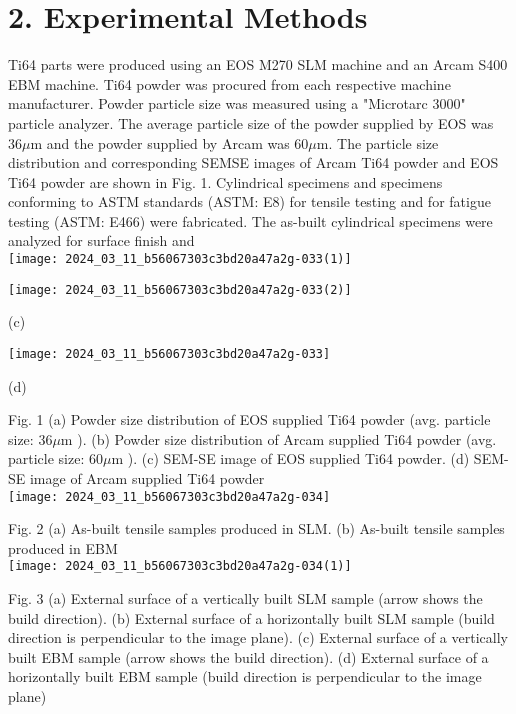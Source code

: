 \documentclass[10pt]{article}
\begin{document}
\section*{2. Experimental Methods}
Ti64 parts were produced using an EOS M270 SLM machine and an Arcam S400 EBM machine. Ti64 powder was procured from each respective machine manufacturer. Powder particle size was measured using a "Microtarc 3000" particle analyzer. The average particle size of the powder supplied by EOS was $36 \mu \mathrm{m}$ and the powder supplied by Arcam was $60 \mu \mathrm{m}$. The particle size distribution and corresponding SEMSE images of Arcam Ti64 powder and EOS Ti64 powder are shown in Fig. 1. Cylindrical specimens and specimens conforming to ASTM standards (ASTM: E8) for tensile testing and for fatigue testing (ASTM: E466) were fabricated. The as-built cylindrical specimens were analyzed for surface finish and\\
\texttt{[image: 2024\_03\_11\_b56067303c3bd20a47a2g-033(1)]}

\begin{center}
\texttt{[image: 2024\_03\_11\_b56067303c3bd20a47a2g-033(2)]}
\end{center}

(c)

\begin{center}
\texttt{[image: 2024\_03\_11\_b56067303c3bd20a47a2g-033]}
\end{center}

(d)

Fig. 1 (a) Powder size distribution of EOS supplied Ti64 powder (avg. particle size: $36 \mu \mathrm{m}$ ). (b) Powder size distribution of Arcam supplied Ti64 powder (avg. particle size: $60 \mu \mathrm{m}$ ). (c) SEM-SE image of EOS supplied Ti64 powder. (d) SEM-SE image of Arcam supplied Ti64 powder\\
\texttt{[image: 2024\_03\_11\_b56067303c3bd20a47a2g-034]}

Fig. 2 (a) As-built tensile samples produced in SLM. (b) As-built tensile samples produced in EBM\\
\texttt{[image: 2024\_03\_11\_b56067303c3bd20a47a2g-034(1)]}

Fig. 3 (a) External surface of a vertically built SLM sample (arrow shows the build direction). (b) External surface of a horizontally built SLM sample (build direction is perpendicular to the image plane). (c) External surface of a vertically built EBM sample (arrow shows the build direction). (d) External surface of a horizontally built EBM sample (build direction is perpendicular to the image plane)
\end{document}
